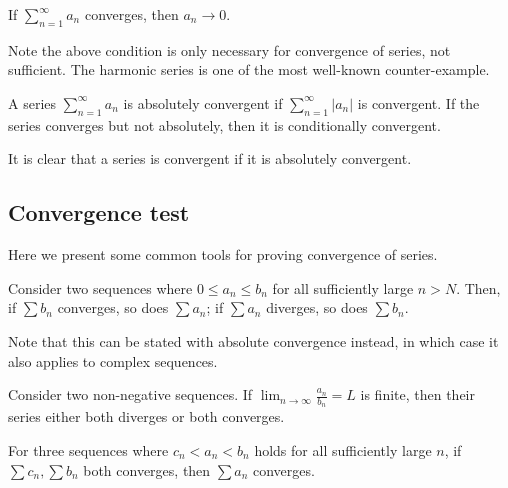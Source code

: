\documentclass[11pt]{article}
\begin{document}
\begin{theorem}
  If \(\sum_{n=1}^\infty a_n\) converges, then \(a_n\to 0\).
\end{theorem}

Note the above condition is only necessary for convergence of series, not sufficient. The harmonic series is one of the most well-known counter-example.
\begin{example}
  
\end{example}

\begin{theorem}
  
\end{theorem}

\begin{definition}
  A series \(\sum_{n=1}^\infty a_n\) is absolutely convergent if \(\sum_{n=1}^\infty |a_n|\) is convergent. If the series converges but not absolutely, then it is conditionally convergent.
\end{definition}
It is clear that a series is convergent if it is absolutely convergent.

\subsection{Convergence test}
Here we present some common tools for proving convergence of series.
\begin{theorem}
  Consider two sequences where \(0\leq a_n\leq b_n\) for all sufficiently large \(n>N\). Then, if \(\sum b_n\) converges, so does \(\sum a_n\); if \(\sum a_n\) diverges, so does \(\sum b_n\).
\end{theorem}
Note that this can be stated with absolute convergence instead, in which case it also applies to complex sequences.

\begin{theorem}
  Consider two non-negative sequences. If \(\lim_{n\to\infty}\frac{a_n}{b_n}=L\) is finite, then their series either both diverges or both converges. 
\end{theorem}

\begin{theorem}
  For three sequences where \(c_n<a_n<b_n\) holds for all sufficiently large \(n\), if \(\sum c_n,\sum b_n\) both converges, then \(\sum a_n\) converges.
\end{theorem}
\end{document}
